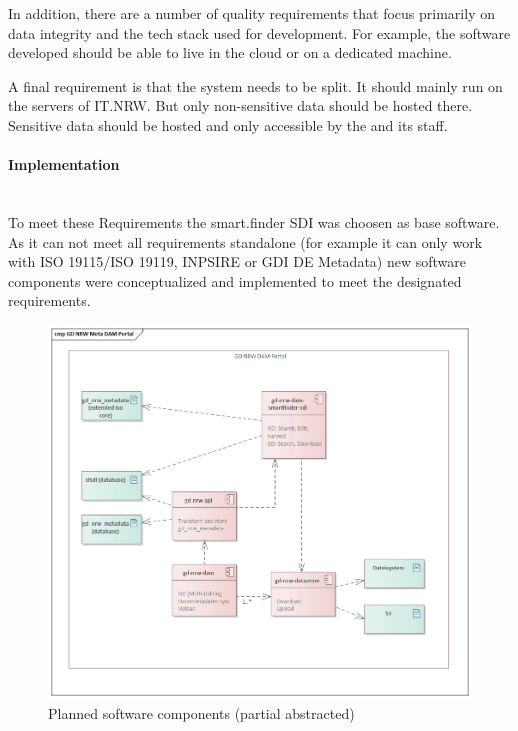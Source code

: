 \documentclass[11pt, titlepage, a4paper]{article}
\newcommand{\myparagraph}[1]{\paragraph{#1}\mbox{}\\}
\begin{document}
In addition, there are a number of quality requirements that focus primarily on data integrity and the tech stack used for development. For example, the software developed should be able to live in the cloud or on a dedicated machine.

A final requirement is that the system needs to be split. It should mainly run on the servers of IT.NRW. But only non-sensitive data should be hosted there. Sensitive data should be hosted and only accessible by the  and its staff.

\myparagraph{Implementation}
To meet these Requirements the smart.finder SDI was choosen as base software. As it can not meet all requirements standalone (for example it can only work with ISO 19115/ISO 19119, INPSIRE or GDI DE Metadata) new software components were conceptualized and implemented to meet the designated requirements.

\begin{figure}[t]
	\caption{Planned software components (partial abstracted)}
	\label{fig:components}
	\includegraphics[width=16cm]{components.png}
	\centering
\end{figure}
\end{document}
